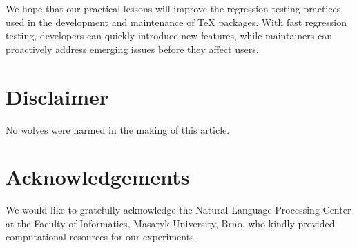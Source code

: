 \documentclass[final]{ltugboat}
\begin{document}
We hope that our practical lessons will improve the regression testing practices used in the development and maintenance of \TeX{} packages. With fast regression testing, developers can quickly introduce new features, while maintainers can proactively address emerging issues before they affect users.

\medskip
\noindent


\section*{Disclaimer}
No wolves were harmed in the making of this article.

\section*{Acknowledgements}
We would like to gratefully acknowledge the Natural Language Processing Center at the Faculty of Informatics, Masaryk University, Brno, who kindly provided computational resources for our experiments.


\begingroup
\gappto{\UrlBreaks}{\UrlOrds}
\RaggedRight

\endgroup

\makesignature
\end{document}
